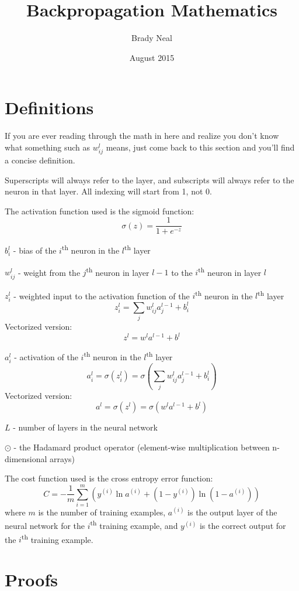 \documentclass[11pt]{article}
\title{Backpropagation Mathematics}
\author{Brady Neal}
\date{August 2015}
\begin{document}
\maketitle

\section{Definitions}

If you are ever reading through the math in here and realize you don't know what something such as $w_{ij}^l$ means, just come back to this section and you'll find a concise definition.

Superscripts will always refer to the layer, and subscripts will always refer to the neuron in that layer. All indexing will start from 1, not 0.

The activation function used is the sigmoid function:
\[\sigma(z) = \frac{1}{1 + e^{-z}}\]

$b_i^l$ - bias of the $i$\textsuperscript{th} neuron in the $l$\textsuperscript{th} layer

$w_{ij}^l$ - weight from the $j$\textsuperscript{th} neuron in layer $l - 1$ to the $i$\textsuperscript{th} neuron in layer $l$

$z_i^l$ - weighted input to the activation function of the $i$\textsuperscript{th} neuron in the $l$\textsuperscript{th} layer
\[z_i^l = \sum_j w_{ij}^l a_j^{l - 1} + b_i^l\]
Vectorized version:
\[z^l = w^l a^{l - 1} + b^l\]

$a_i^l$ - activation of the $i$\textsuperscript{th} neuron in the $l$\textsuperscript{th} layer
\[a_i^l = \sigma(z_i^l) = \sigma\left(\sum_j w_{ij}^l a_j^{l - 1} + b_i^l\right)\]
Vectorized version:
\[a^l = \sigma(z^l) = \sigma(w^l a^{l - 1} + b^l)\]

$L$ - number of layers in the neural network

$\odot$ - the Hadamard product operator (element-wise multiplication between n-dimensional arrays)

The cost function used is the cross entropy error function:
\[C = - \frac{1}{m} \sum_{i = 1}^m \left(y^{(i)} \ln a^{(i)} + \left(1 - y^{(i)}\right) \ln \left(1 - a^{(i)}\right)\right)\]
where $m$ is the number of training examples, $a^{(i)}$ is the output layer of the neural network for the $i$\textsuperscript{th} training example, and $y^{(i)}$ is the correct output for the $i$\textsuperscript{th} training example.

\section{Proofs}
\end{document}
